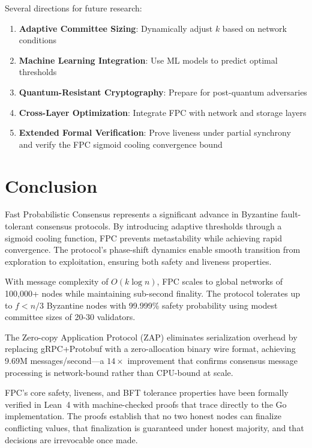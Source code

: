 \documentclass[11pt,a4paper]{article}
\begin{document}
Several directions for future research:

\begin{enumerate}
\item \textbf{Adaptive Committee Sizing}: Dynamically adjust $k$ based on network conditions
\item \textbf{Machine Learning Integration}: Use ML models to predict optimal thresholds
\item \textbf{Quantum-Resistant Cryptography}: Prepare for post-quantum adversaries
\item \textbf{Cross-Layer Optimization}: Integrate FPC with network and storage layers
\item \textbf{Extended Formal Verification}: Prove liveness under partial synchrony and verify the FPC sigmoid cooling convergence bound
\end{enumerate}

\section{Conclusion}
\label{sec:conclusion}

Fast Probabilistic Consensus represents a significant advance in Byzantine fault-tolerant consensus protocols. By introducing adaptive thresholds through a sigmoid cooling function, FPC prevents metastability while achieving rapid convergence. The protocol's phase-shift dynamics enable smooth transition from exploration to exploitation, ensuring both safety and liveness properties.

With message complexity of $O(k \log n)$, FPC scales to global networks of 100,000+ nodes while maintaining sub-second finality. The protocol tolerates up to $f < n/3$ Byzantine nodes with 99.999\% safety probability using modest committee sizes of 20-30 validators.

The Zero-copy Application Protocol (ZAP) eliminates serialization overhead by replacing gRPC+Protobuf with a zero-allocation binary wire format, achieving 9.69M messages/second---a $14\times$ improvement that confirms consensus message processing is network-bound rather than CPU-bound at scale.

FPC's core safety, liveness, and BFT tolerance properties have been formally verified in Lean~4 with machine-checked proofs that trace directly to the Go implementation. The proofs establish that no two honest nodes can finalize conflicting values, that finalization is guaranteed under honest majority, and that decisions are irrevocable once made.
\end{document}
